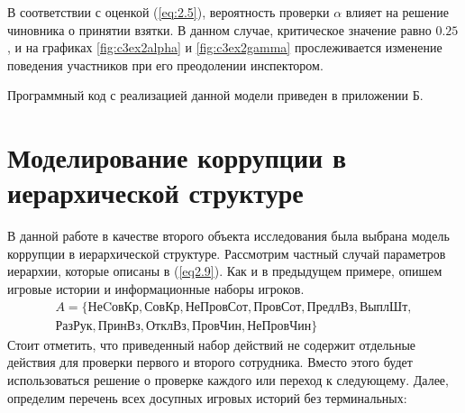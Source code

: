 \par
В соответствии с оценкой (\ref{eq:2.5}), вероятность проверки $\alpha$ влияет на решение чиновника о принятии взятки. В данном случае, критическое значение равно $0.25$, и на графиках \ref{fig:c3ex2alpha} и \ref{fig:c3ex2gamma} прослеживается изменение поведения участников при его преодолении инспектором.
\par
Программный код с реализацией данной модели приведен в приложении Б.

\section{Моделирование коррупции в иерархической структуре}

В данной работе в качестве второго объекта исследования была выбрана модель коррупции в иерархической структуре. Рассмотрим частный случай параметров иерархии, которые описаны в (\ref{eq2.9}). Как и в предыдущем примере, опишем игровые истории и информационные наборы игроков.
\begin{align*}
	A = \{\text{НеCовКр}, \text{СовКр}, \text{НеПровСот}, \text{ПровСот}, \text{ПредлВз}, \text{ВыплШт},\\ \text{РазРук}, \text{ПринВз}, \text{ОтклВз}, \text{ПровЧин}, \text{НеПровЧин} \}
\end{align*}
Стоит отметить, что приведенный набор действий не содержит отдельные действия для проверки первого и второго сотрудника. Вместо этого будет использоваться решение о проверке каждого или переход к следующему.
Далее, определим перечень всех досупных игровых историй без терминальных:

